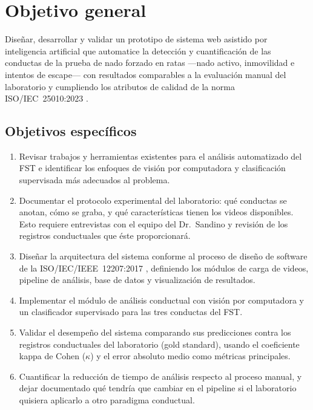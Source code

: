 \section{Objetivo general}

Diseñar, desarrollar y validar un prototipo de sistema web asistido por inteligencia
artificial que automatice la detección y cuantificación de las conductas de la prueba
de nado forzado en ratas ---nado activo, inmovilidad e intentos de escape--- con
resultados comparables a la evaluación manual del laboratorio y cumpliendo los
atributos de calidad de la norma ISO/IEC~25010:2023 \cite{iso25010}.

\subsection{Objetivos específicos}
\begin{enumerate}
  \item Revisar trabajos y herramientas existentes para el análisis automatizado del
        FST e identificar los enfoques de visión por computadora y clasificación
        supervisada más adecuados al problema.
  \item Documentar el protocolo experimental del laboratorio: qué conductas se anotan,
        cómo se graba, y qué características tienen los videos disponibles. Esto
        requiere entrevistas con el equipo del Dr.\ Sandino y revisión de los
        registros conductuales que éste proporcionará.
  \item Diseñar la arquitectura del sistema conforme al proceso de diseño de software
        de la ISO/IEC/IEEE~12207:2017 \cite{iso12207}, definiendo los módulos de carga
        de videos, pipeline de análisis, base de datos y visualización de resultados.
  \item Implementar el módulo de análisis conductual con visión por computadora y un
        clasificador supervisado para las tres conductas del FST.
  \item Validar el desempeño del sistema comparando sus predicciones contra los
        registros conductuales del laboratorio (gold standard), usando el coeficiente
        kappa de Cohen ($\kappa$) y el error absoluto medio como métricas principales.
  \item Cuantificar la reducción de tiempo de análisis respecto al proceso manual, y
        dejar documentado qué tendría que cambiar en el pipeline si el laboratorio
        quisiera aplicarlo a otro paradigma conductual.
\end{enumerate}

